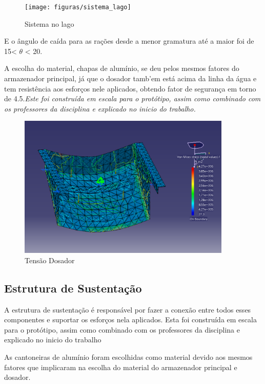  \begin{figure}[h]
    \centering
    \texttt{[image: figuras/sistema\_lago]}
    \caption{Sistema no lago}
  \end{figure}

E o ângulo de caída para as rações desde a menor gramatura até a maior foi de 15\textdegree < $\theta$ < 20\textdegree.


A escolha do material, chapas de alum\'{i}nio, se deu pelos mesmos fatores do armazenador principal, j\'{a} que o dosador tamb'{e}m est\'{a} acima da linha da \'{a}gua e tem resist\^{e}ncia aos esfor\c{c}os nele aplicados, obtendo fator de seguran\c{c}a em torno de 4.5.\textit{Este foi constru\'{i}da em escala para o prot\'{o}tipo, assim como combinado com os professores da disciplina e explicado no inicio do trabalho.}\\


\begin{figure}[h]
  \centering
  \includegraphics[width=4in]{figuras/Dosador_Tensao}
  \caption{Tens\~{a}o Dosador}
\end{figure}


\subsection{Estrutura de Sustenta\c{c}\~{a}o}

A estrutura de sustenta\c{c}\~{a}o \'{e} respons\'{a}vel por fazer a conex\~{a}o entre todos esses componentes e suportar os esfor\c{c}os nela aplicados. Esta foi constru\'{i}da em escala para o prot\'{o}tipo, assim como combinado com os professores da disciplina e explicado no inicio do trabalho

As cantoneiras de alum\'{i}nio foram escolhidas como material devido aos mesmos fatores que implicaram na escolha do material do armazenador principal e dosador.

